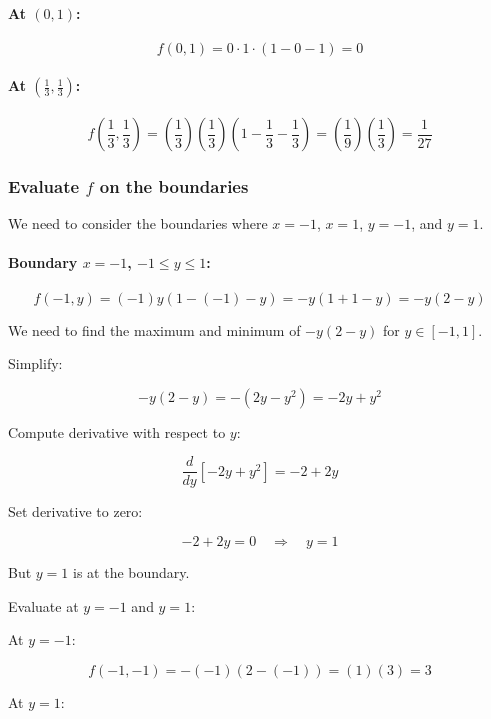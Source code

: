 \documentclass[11pt]{article}
\begin{document}
\paragraph{At \( (0, 1) \):}

\[
f(0, 1) = 0 \cdot 1 \cdot (1 - 0 - 1) = 0
\]

\paragraph{At \( \left( \frac{1}{3}, \frac{1}{3} \right) \):}

\[
f\left( \frac{1}{3}, \frac{1}{3} \right) = \left( \frac{1}{3} \right) \left( \frac{1}{3} \right) \left( 1 - \frac{1}{3} - \frac{1}{3} \right) = \left( \frac{1}{9} \right) \left( \frac{1}{3} \right) = \frac{1}{27}
\]

\newpage

\subsubsection{Evaluate \( f \) on the boundaries}

We need to consider the boundaries where \( x = -1 \), \( x = 1 \), \( y = -1 \), and \( y = 1 \).

\paragraph{Boundary \( x = -1 \), \( -1 \leq y \leq 1 \):}

\[
f(-1, y) = (-1)y(1 - (-1) - y) = -y(1 + 1 - y) = -y(2 - y)
\]

We need to find the maximum and minimum of \( -y(2 - y) \) for \( y \in [-1, 1] \).

Simplify:

\[
- y (2 - y) = - (2 y - y^2) = -2 y + y^2
\]

Compute derivative with respect to \( y \):

\[
\frac{d}{dy} [ -2 y + y^2 ] = -2 + 2 y
\]

Set derivative to zero:

\[
-2 + 2 y = 0 \quad \Rightarrow \quad y = 1
\]

But \( y = 1 \) is at the boundary.

Evaluate at \( y = -1 \) and \( y = 1 \):

At \( y = -1 \):

\[
f(-1, -1) = -(-1)(2 - (-1)) = (1)(3) = 3
\]

At \( y = 1 \):
\end{document}
